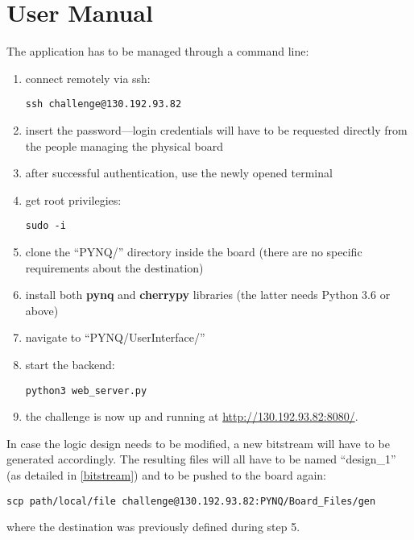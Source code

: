 \chapter{User Manual}
\label{usermanual}
The application has to be managed through a command line:
\begin{enumerate}
\item connect remotely via ssh: \begin{verbatim}ssh challenge@130.192.93.82\end{verbatim}
\item insert the password---login credentials will have to be requested directly from the people managing the physical board
\item after successful authentication, use the newly opened terminal
\item get root privilegies: \begin{verbatim}sudo -i\end{verbatim}
\item clone the ``PYNQ/'' directory inside the board (there are no specific requirements about the destination)
\item install both \textbf{pynq} and \textbf{cherrypy} libraries (the latter needs Python 3.6 or above)
\item navigate to ``PYNQ/UserInterface/''
\item start the backend: \begin{verbatim}python3 web_server.py\end{verbatim}
\item the challenge is now up and running at \url{http://130.192.93.82:8080/}.
\end{enumerate}
In case the logic design needs to be modified, a new bitstream will have to be generated accordingly.
The resulting files will all have to be named ``design\_1'' (as detailed in \autoref{bitstream}) and to be pushed to the board again:
\begin{verbatim}scp path/local/file challenge@130.192.93.82:PYNQ/Board_Files/gen\end{verbatim}
where the destination was previously defined during step 5.